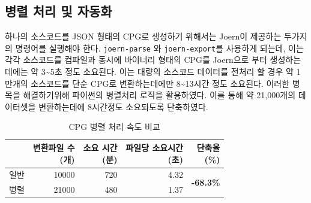 \subsection{병렬 처리 및 자동화}

하나의 소스코드를 JSON 형태의 CPG로 생성하기 위해서는 Joern이 제공하는 두가지의 명령어를 실행해야 한다. \verb|joern-parse| 와 \verb|joern-export|를 사용하게 되는데, 이는 각각 소스코드를 컴파일과 동시에 바이너리 형태의 CPG를  Joern으로 부터 생성하는 데에는 약 3\textasciitilde5초 정도 소요된다.
이는 대량의 소스코드 데이터를 전처리 할 경우 약 1만개의 소스코드를 단순 CPG로 변환하는데에만 8\textasciitilde13시간 정도 소요된다.
이러한 병목을 해결하기위해 파이썬의 병렬처리 로직을 활용하였다.
이를 통해 약 21,000개의 데이터셋을 변환하는데에 8시간정도 소요되도록 단축하였다.


\begin{table}[]
\centering
\begin{tabular}{@{}lrrrr@{}}
\toprule
 & \makecell[r]{변환파일 수 \\ (개)} & \makecell[r]{소요 시간 \\ (분)} & \makecell[r]{파일당 소요시간 \\ (초)} & \makecell[r]{단축율 \\ (\%)} \\ \midrule
일반 & 10000 & 720 & 4.32 & \multirow{2}{*}{\textbf{-68.3\%}} \\
병렬 & 21000 & 480 & 1.37 &  \\ \bottomrule
\end{tabular}
\caption{CPG 병렬 처리 속도 비교}
\label{tab:cpg-convertion-time-table}
\end{table}